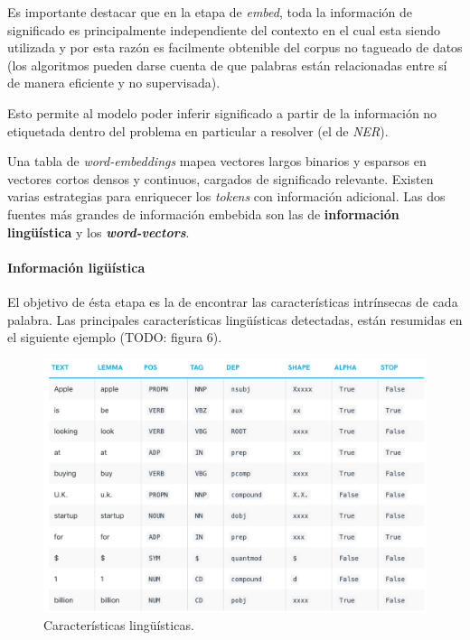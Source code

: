 \documentclass[12pt,a4paper,]{scrartcl}
\let\oldparagraph\paragraph
\renewcommand{\paragraph}[1]{\oldparagraph{#1}\mbox{}}
\begin{document}
Es importante destacar que en la etapa de \emph{embed}, toda la información de significado es principalmente independiente del contexto en el cual esta siendo utilizada y por esta razón es facilmente obtenible del corpus no tagueado de datos (los algoritmos pueden darse cuenta de que palabras están relacionadas entre sí de manera eficiente y no supervisada).

Esto permite al modelo poder inferir significado a partir de la información no etiquetada dentro del problema en particular a resolver (el de \emph{NER}).

Una tabla de \emph{word-embeddings} mapea vectores largos binarios y esparsos en vectores cortos densos y continuos, cargados de significado relevante. Existen varias estrategias para enriquecer los \emph{tokens} con información adicional. Las dos fuentes más grandes de información embebida son las de \textbf{información lingüística} y los \textbf{\emph{word-vectors}}.

\hypertarget{informaciuxf3n-liguxfcuxedstica}{%
\paragraph{Información ligüística}\label{informaciuxf3n-liguxfcuxedstica}}

El objetivo de ésta etapa es la de encontrar las características intrínsecas de cada palabra. Las principales características lingüísticas detectadas, están resumidas en el siguiente ejemplo (TODO: figura 6).

\begin{figure}[H]

{\centering \includegraphics{assets/pos.pdf} 

}

\caption{Características lingüísticas.}\label{fig:formula-pos}
\end{figure}
\end{document}
